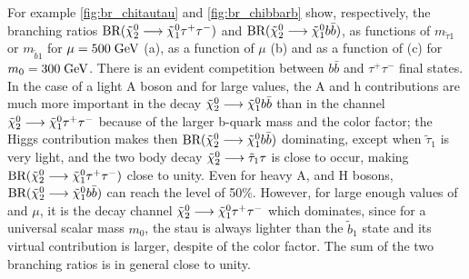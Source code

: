 For example \autoref{fig:br_chitautau} and \autoref{fig:br_chibbarb} show, respectively, the branching ratios $\text{BR}(\tilde{\chi}^{0}_{2} \longrightarrow \tilde{\chi}^{0}_{1}\tau^{+}\tau^{-} )$ and $\text{BR}(\tilde{\chi}^{0}_{2} \longrightarrow \tilde{\chi}^{0}_{1} b \bar{b})$, as functions of $m_{\widetilde{\tau}1}$ or $m_{\widetilde{b}1}$ for $\mu = 500\;\text{Ge}\kern-0.06667em\text{V}$ (a), as a function of $\mu$ (b) and as a function of \tanbeta (c) for $m_{0} = 300\;\text{Ge}\kern-0.06667em\text{V}$. There is an evident competition between $b\bar{b}$ and $\tau^{+}\tau^{-}$ final states. In the case of a light A boson and for large \tanbeta values, the A and h contributions are much more important in the decay $\tilde{\chi}^{0}_{2} \longrightarrow \tilde{\chi}^{0}_{1} b \bar{b}$ than in the channel $\tilde{\chi}^{0}_{2} \longrightarrow \tilde{\chi}^{0}_{1}\tau^{+}\tau^{-} $ because of the larger b-quark mass and the color factor; the Higgs contribution makes then $\text{BR}(\tilde{\chi}^{0}_{2} \longrightarrow \tilde{\chi}^{0}_{1} b \bar{b})$ dominating, except when $\widetilde{\tau}_{1}$ is very light, and the two body decay $\tilde{\chi}^{0}_{2} \longrightarrow \tilde{\tau}_{1} \tau$ is close to occur, making $\text{BR}(\tilde{\chi}^{0}_{2} \longrightarrow \tilde{\chi}^{0}_{1}\tau^{+}\tau^{-} )$ close to unity. Even for heavy A, and H bosons, $\text{BR}(\tilde{\chi}^{0}_{2} \longrightarrow \tilde{\chi}^{0}_{1} b \bar{b})$ can reach the level of 50\%. However, for large enough values of \tanbeta and $\mu$, it is the decay channel $\tilde{\chi}^{0}_{2} \longrightarrow \tilde{\chi}^{0}_{1}\tau^{+}\tau^{-} $ which dominates, since for a universal scalar mass $m_{0}$, the stau is always lighter than the $\widetilde{b}_{1}$ state and its virtual contribution is larger, despite of the color factor. The sum of the two branching ratios is in general close to unity.

